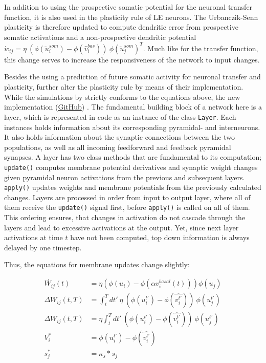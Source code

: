 In addition to using the prospective somatic potential for the neuronal transfer function, it is also used in the
plasticity rule of LE neurons. The Urbanczik-Senn plasticity is therefore updated to compute dendritic error from
prospective somatic activations and a non-prospective dendritic potential $\dot{w}_{ij}= \eta \ ( \phi(\breve{u}_i^{som}) -
  \phi(\hat{v}_i^{bas}) ) \ \phi(\breve{u}_j^{som})^T$. Much like for the transfer function, this change serves to
increase the responsiveness of the network to input changes. \newline


Besides the using a prediction of future somatic activity for neuronal transfer and plasticity, \cite{Haider2021}
further alter the plasticity rule by means of their implementation. While the simulations by
\cite{sacramento2018dendritic} strictly conforms to the equations above, the new implementation
(\href{https://github.com/neurips}{GitHub}) . The fundamental building block of a network here is a layer, which is
represented in code as an instance of the class \texttt{Layer}. Each instances holds information about its corresponding
pyramidal- and interneurons. It also holds information about the synaptic connections between the two populations, as
well as all incoming feedforward and feedback pyramidal synapses. A layer has two class methods that are fundamental to
its computation; \texttt{update()} computes membrane potential derivatives and synaptic weight changes given pyramidal
neuron activations from the previous and subsequent layers. \texttt{apply()} updates weights and membrane potentials
from the previously calculated changes. Layers are processed in order from input to output layer, where all of them
receive the \texttt{update()} signal first, before \texttt{apply()} is called on all of them. This ordering ensures,
that changes in activation do not cascade through the layers and lead to excessive activations at the output. Yet, since
next layer activations at time $t$ have not been computed, top down information is always delayed by one timestep.


Thus, the equations for membrane updates change slightly:

\begin{align}
  \dot{W_{ij}}(t)    & = \eta (\phi(u_i) - \phi(\alpha v^{basal}_i(t))) \phi(u_j)                             \\
  \Delta W_{ij}(t,T) & = \int_t^T dt' \ \eta \  (\phi(u_i^{t'}) - \phi(\widehat{v_i^{t'}})) \  \phi(u_j^{t'}) \\
  \Delta W_{ij}(t,T) & = \eta \int_t^T dt' \  (\phi(u_i^{t'}) - \phi(\widehat{v_i^{t'}})) \ \phi(u_j^{t'})    \\
  V_i^*              & = \phi(u_i^{t'}) - \phi(\widehat{v_i^{t'}})                                            \\
  s_j^*              & = \kappa_s * s_j
\end{align}



